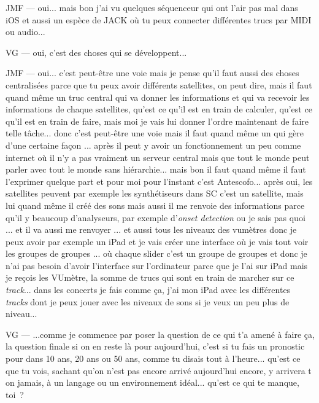 JMF — oui... mais bon j'ai vu quelques séquenceur qui ont l'air pas mal dans iOS et aussi un espèce de JACK où tu peux connecter différentes trucs par MIDI ou audio...  

VG — oui, c'est des choses qui se développent... 

JMF — oui... c'est peut-être une voie mais je pense qu'il faut aussi des choses centralisées parce que tu peux avoir différents satellites, on peut dire, mais il faut quand même un truc central qui va donner les informations et qui va recevoir les informations de chaque satellites, qu'est ce qu'il est en train de calculer, qu'est ce qu'il est en train de faire, mais moi je vais lui donner l'ordre maintenant de faire telle tâche... donc c'est peut-être une voie mais il faut quand même un qui gère d'une certaine façon ... après il peut y avoir un fonctionnement un peu comme internet où il n'y a pas vraiment un serveur central mais que tout le monde peut parler avec tout le monde sans hiérarchie... mais bon il faut quand même il faut l'exprimer quelque part et pour moi pour l'instant c'est Antescofo... après oui, les satellites peuvent par exemple les synthétiseurs dans SC c'est un satellite, mais lui quand même il créé des sons mais aussi il me renvoie des informations parce qu'il y beaucoup d'analyseurs, par exemple d'\textit{onset detection} ou je sais pas quoi ... et il va aussi me renvoyer ... et aussi tous les niveaux des vumètres donc je peux avoir par exemple un iPad et je vais créer une interface où je vais tout voir les groupes de groupes ... où chaque slider c'est un groupe de groupes et donc je n'ai pas besoin d'avoir l'interface sur l'ordinateur parce que je l'ai sur iPad mais je reçois les VUmètre, la somme de trucs qui sont en train de marcher sur ce \textit{track}... dans les concerts je fais comme ça, j'ai mon iPad avec les différentes \textit{tracks} dont je peux jouer avec les niveaux de sons si je veux un peu plus de niveau... 

VG — ...comme je commence par poser la question de ce qui t'a amené à faire ça, la question finale si on en reste là pour aujourd'hui, c'est si tu fais un pronostic pour dans 10 ans, 20 ans ou 50 ans, comme tu disais tout à l'heure... qu'est ce que tu vois, sachant qu'on n'est pas encore arrivé aujourd'hui encore, y arrivera t on jamais, à un langage ou un environnement idéal... qu'est ce qui te manque, toi ? 

